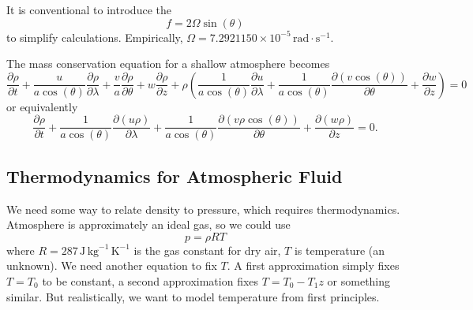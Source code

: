 \begin{defn}
It is conventional to introduce the 
\begin{equation}
  f = 2\Omega\sin(\theta)
\end{equation}
to simplify calculations. Empirically, $\Omega=7.2921150\times10^{-5}\,\mathrm{rad}\cdot\mathrm{s}^{-1}$.
\end{defn}


\begin{prop}
The mass conservation equation for a shallow atmosphere becomes
\begin{equation}
  \frac{\partial\rho}{\partial t}
  + \frac{u}{a\cos(\theta)}\frac{\partial\rho}{\partial\lambda}
  + \frac{v}{a}\frac{\partial\rho}{\partial\theta}
  + w\frac{\partial\rho}{\partial z}
  + \rho\left(\frac{1}{a\cos(\theta)}\frac{\partial u}{\partial\lambda}
              + \frac{1}{a\cos(\theta)}\frac{\partial(v\cos(\theta))}{\partial\theta}
              + \frac{\partial w}{\partial z}
       \right)
  = 0
\end{equation}
or equivalently
\begin{equation}
  \frac{\partial\rho}{\partial t}
  + \frac{1}{a\cos(\theta)}\frac{\partial(u\rho)}{\partial\lambda}
  + \frac{1}{a\cos(\theta)}\frac{\partial(v\rho\cos(\theta))}{\partial\theta}
  + \frac{\partial(w\rho)}{\partial z}
  = 0.
\end{equation}
\end{prop}

\subsection{Thermodynamics for Atmospheric Fluid}
We need some way to relate density to pressure, which requires
thermodynamics. Atmosphere is approximately an ideal gas, so we could
use
\begin{equation}
  p = \rho R T
\end{equation}
where $R=287\,\mathrm{J}\,\mathrm{kg}^{-1}\,\mathrm{K}^{-1}$ is the gas
constant for dry air, $T$ is temperature (an unknown). We need another
equation to fix $T$. A first approximation simply fixes $T=T_{0}$ to be
constant, a second approximation fixes $T=T_{0}-T_{1}z$ or something
similar. But realistically, we want to model temperature from first
principles.

